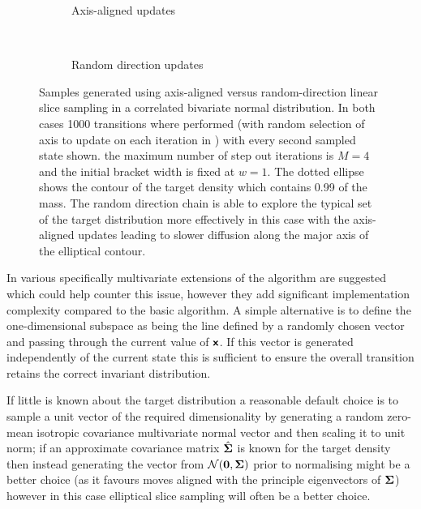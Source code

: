 \begin{figure}
\centering
\begin{subfigure}[b]{.46\linewidth}
\centering
  \vspace{-6mm}
  \caption{Axis-aligned updates}
  \label{sfig:axis-aligned-linear-slice-sampler}
\end{subfigure}
~~
\begin{subfigure}[b]{.46\linewidth}
\centering
  \vspace{-6mm}
  \caption{Random direction updates}
  \label{sfig:random-direction-linear-slice-sampler}
\end{subfigure}
  \caption[Linear slice sampler comparison.]{Samples generated using  axis-aligned versus  random-direction  linear slice sampling in a correlated bivariate normal distribution. In both cases 1000 transitions where performed (with random selection of axis to update on each iteration in ) with every second sampled state shown.  the maximum number of step out iterations is $M=4$ and the initial bracket width is fixed at $w=1$. The dotted ellipse shows the contour of the target density which contains 0.99 of the mass. The random direction chain is able to explore the typical set of the target distribution more effectively in this case with the axis-aligned updates leading to slower diffusion along the major axis of the elliptical contour.}
  \label{fig:linear-slice-sampler-comparison}
\end{figure}

In \citep{neal2003slice} various specifically multivariate extensions of the algorithm are suggested which could help counter this issue, however they add significant implementation complexity compared to the basic algorithm. A simple alternative is to define the one-dimensional subspace as being the line defined by a randomly chosen vector and passing through the current value of $\boldsymbol{\mathsf{x}}$. If this vector is generated independently of the current state this is sufficient to ensure the overall transition retains the correct invariant distribution. 

If little is known about the target distribution a reasonable default choice is to sample a unit vector of the required dimensionality by generating a random zero-mean isotropic covariance multivariate normal vector and then scaling it to unit norm; if an approximate covariance matrix $\hat{\boldsymbol{\Sigma}}$ is known for the target density then instead generating the vector from $\nrm{\vct{0},\mtx{\Sigma}}$ prior to normalising might be a better choice (as it favours moves aligned with the principle eigenvectors of $\boldsymbol{\Sigma}$) however in this case elliptical slice sampling will often be a better choice. 

